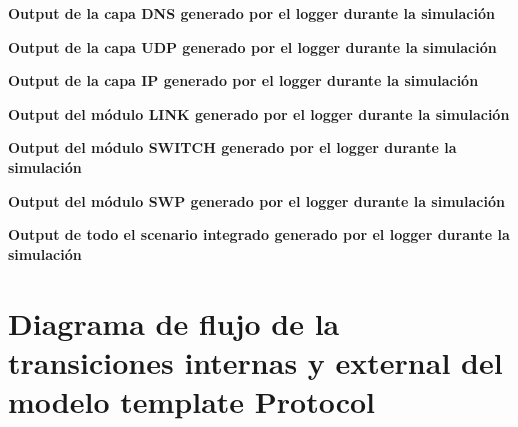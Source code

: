 \documentclass[10pt,a4paper]{article}
\begin{document}
\textbf{Output de la capa DNS generado por el logger durante la simulación}


\textbf{Output de la capa UDP generado por el logger durante la simulación}


\textbf{Output de la capa IP generado por el logger durante la simulación}


\textbf{Output del módulo LINK generado por el logger durante la simulación}


\textbf{Output del módulo SWITCH generado por el logger durante la simulación}


\textbf{Output del módulo SWP generado por el logger durante la simulación}


\textbf{Output de todo el scenario integrado generado por el logger durante la simulación}


\section{Diagrama de flujo de la transiciones internas y external del modelo template Protocol}
\label{appendix: internal external transition flow}
\end{document}
